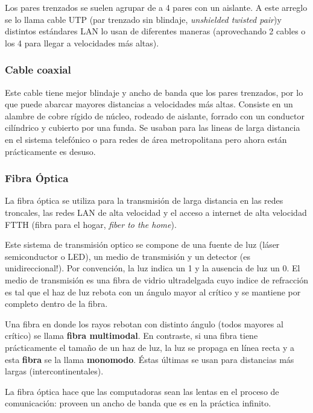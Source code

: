 \documentclass{book}
\begin{document}
	\vspace{3mm}
	Los pares trenzados se suelen agrupar de a 4 pares con un aislante. A este arreglo se lo llama cable UTP (par trenzado sin blindaje, \textit{unshielded twisted pair})y distintos estándares LAN lo usan de diferentes maneras (aprovechando 2 cables o los 4 para llegar a velocidades más altas).
	
	\subsubsection{Cable coaxial}
	Este cable tiene mejor blindaje y ancho de banda que los pares trenzados, por lo que puede abarcar mayores distancias a velocidades más altas. Consiste en un alambre de cobre rígido de núcleo, rodeado de aislante, forrado con un conductor cilíndrico y cubierto por una funda. Se usaban para las lineas de larga distancia en el sistema telefónico o para redes de área metropolitana pero ahora están prácticamente es desuso.
	
	\subsubsection{Fibra Óptica}
	La fibra óptica se utiliza para la transmisión de larga distancia en las redes troncales, las redes LAN de alta velocidad y el acceso a internet de alta velocidad FTTH (fibra para el hogar, \textit{fiber to the home}).
	
	\vspace{3mm}
	Este sistema de transmisión optico se compone de una fuente de luz (láser semiconductor o LED), un medio de transmisión y un detector (es unidireccional!). Por convención, la luz indica un 1 y la ausencia de luz un 0. El medio de transmisión es una fibra de vidrio ultradelgada cuyo indice de refracción es tal que el haz de luz rebota con un ángulo mayor al crítico y se mantiene por completo dentro de la fibra.
	
	\vspace{3mm}
	Una fibra en donde los rayos rebotan con distinto ángulo (todos mayores al crítico) se llama \textbf{fibra multimodal}. En contraste, si una fibra tiene prácticamente el tamaño de un haz de luz, la luz se propaga en línea recta y a esta \textbf{fibra} se la llama \textbf{monomodo}. Éstas últimas se usan para distancias más largas (intercontinentales).
	
	\vspace{3mm}
	La fibra óptica hace que las computadoras sean las lentas en el proceso de comunicación: proveen un ancho de banda que es en la práctica infinito.
	
\end{document}

